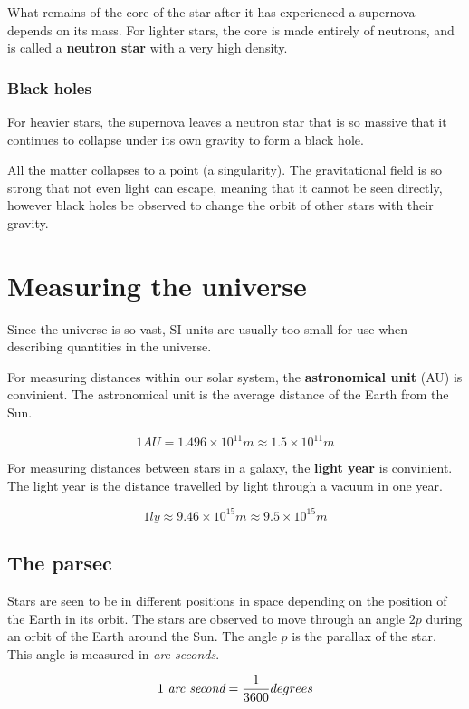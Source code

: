 \documentclass{article}
\begin{document}
What remains of the core of the star after it has experienced a supernova
depends on its mass. For lighter stars, the core is made entirely of neutrons,
and is called a {\bf neutron star} with a very high density.

\subsubsection{Black holes}

For heavier stars, the supernova leaves a neutron star that is so massive that
it continues to collapse under its own gravity to form a black hole.

All the matter collapses to a point (a singularity). The gravitational field is
so strong that not even light can escape, meaning that it cannot be seen
directly, however black holes be observed to change the orbit of other stars
with their gravity.

\section{Measuring the universe}

Since the universe is so vast, SI units are usually too small for use when
describing quantities in the universe.

For measuring distances within our solar system, the {\bf astronomical unit}
(AU) is convinient. The astronomical unit is the average distance of the Earth
from the Sun.

\[
	1AU = 1.496\times10^{11}m \approx 1.5\times10^{11}m
\]

For measuring distances between stars in a galaxy, the {\bf light year} is
convinient. The light year is the distance travelled by light through a vacuum
in one year.

\[
	1ly \approx 9.46\times10^{15}m \approx 9.5\times10^{15}m 
\]

\subsection{The parsec}

Stars are seen to be in different positions in space depending on the position
of the Earth in its orbit. The stars are observed to move through an angle $2p$
during an orbit of the Earth around the Sun. The angle $p$ is the parallax of
the star. This angle is measured in {\it arc seconds}.

\[
	1 \textrm{ \it arc second} = \frac{1}{3600}degrees
\]
\end{document}
